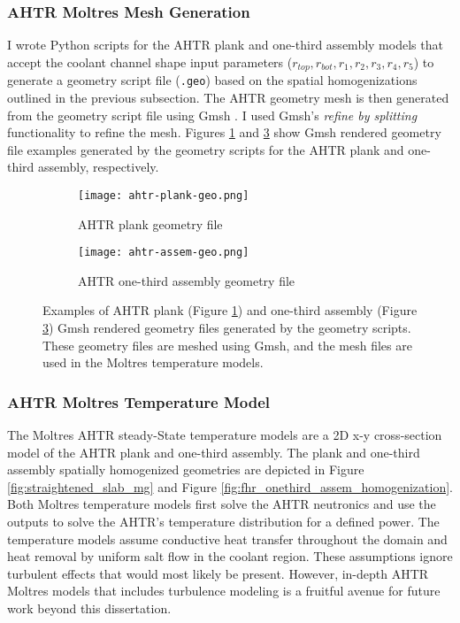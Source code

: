 \subsubsection{AHTR Moltres Mesh Generation}
I wrote Python scripts for the \gls{AHTR} plank and one-third assembly models 
that accept the coolant channel shape input parameters 
($r_{top}, r_{bot}, r_1, r_2, r_3, r_4, r_5$) to generate a geometry script file 
(\texttt{.geo}) based on the spatial homogenizations outlined in the previous 
subsection.
The \gls{AHTR} geometry mesh is then generated from the geometry script file using 
Gmsh \cite{geuzaine_gmsh_2009}.
I used Gmsh's \textit{refine by splitting} functionality to refine the mesh. 
Figures \ref{fig:ahtr-plank-geo} and \ref{fig:ahtr-assem-geo} show Gmsh rendered 
geometry file examples generated by the geometry scripts for the \gls{AHTR} plank 
and one-third assembly, respectively.
\begin{figure}[htbp]
    \centering
    \begin{subfigure}{\textwidth}
        \texttt{[image: ahtr-plank-geo.png]}
        \caption{\acrfull{AHTR} plank geometry file}
        \label{fig:ahtr-plank-geo} 
    \end{subfigure}
    \begin{subfigure}{\textwidth}
        \texttt{[image: ahtr-assem-geo.png]}
        \caption{\acrfull{AHTR} one-third assembly geometry file}
        \label{fig:ahtr-assem-geo} 
    \end{subfigure}
    \caption{Examples of \gls{AHTR} plank (Figure \ref{fig:ahtr-plank-geo}) and 
    one-third assembly (Figure \ref{fig:ahtr-assem-geo}) Gmsh rendered geometry files 
    generated by the geometry scripts.
    These geometry files are meshed using Gmsh, and the mesh files are used in the 
    Moltres temperature models.}
\end{figure}

\subsubsection{AHTR Moltres Temperature Model}
\label{sec:ahtr-moltres-temperature-model}
The Moltres \gls{AHTR} steady-State temperature models are a 2D x-y cross-section 
model of the \gls{AHTR} plank and one-third assembly.
The plank and one-third assembly spatially homogenized geometries are depicted in
Figure \ref{fig:straightened_slab_mg} and Figure 
\ref{fig:fhr_onethird_assem_homogenization}.  
Both Moltres temperature models first solve the \gls{AHTR} neutronics and use the 
outputs to solve the \gls{AHTR}'s temperature distribution for a defined power.
The temperature models assume conductive heat transfer throughout the domain 
and heat removal by uniform salt flow in the coolant region. 
These assumptions ignore turbulent effects that would most likely be present. 
However, in-depth \gls{AHTR} Moltres models that includes turbulence modeling is 
a fruitful avenue for future work beyond this dissertation. 

